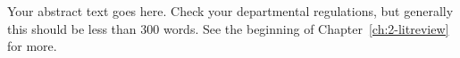 Your abstract text goes here.  Check your departmental regulations, but generally this should be less than 300 words.  See the beginning of Chapter~\ref{ch:2-litreview} for more.
